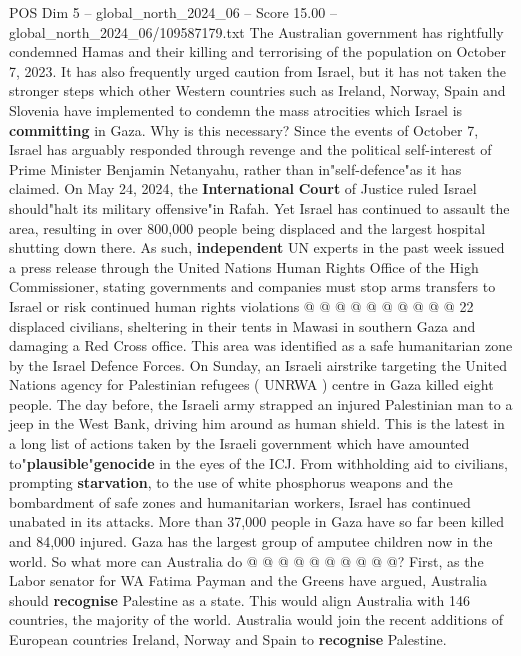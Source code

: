 \begin{textsample}{POS Dim 5 – global\_north\_2024\_06 – Score 15.00 – global\_north\_2024\_06/109587179.txt}  \label{ex:f5_pos_317}
The Australian government has rightfully condemned Hamas and their killing and terrorising of the population on October 7, 2023.
It has also frequently urged caution from Israel, but it has not taken the stronger steps which other Western countries such as Ireland, Norway, Spain and Slovenia have implemented to condemn the mass atrocities which Israel is \textbf{committing} in Gaza.
Why is this necessary?
Since the events of October 7, Israel has arguably responded through revenge and the political self-interest of Prime Minister Benjamin Netanyahu, rather than in"self-defence"as it has claimed.
On May 24, 2024, the \textbf{International} \textbf{Court} of Justice ruled Israel should"halt its military offensive"in Rafah.
Yet Israel has continued to assault the area, resulting in over 800,000 people being displaced and the largest hospital shutting down there.
As such, \textbf{independent} UN experts in the past week issued a press release through the United Nations Human Rights Office of the High Commissioner, stating governments and companies must stop arms transfers to Israel or risk continued human rights violations @ @ @ @ @ @ @ @ @ @ 22 displaced civilians, sheltering in their tents in Mawasi in southern Gaza and damaging a Red Cross office.
This area was identified as a safe humanitarian zone by the Israel Defence Forces.
On Sunday, an Israeli airstrike targeting the United Nations agency for Palestinian refugees ( UNRWA ) centre in Gaza killed eight people.
The day before, the Israeli army strapped an injured Palestinian man to a jeep in the West Bank, driving him around as human shield.
This is the latest in a long list of actions taken by the Israeli government which have amounted to"\textbf{plausible}"\textbf{genocide} in the eyes of the ICJ.
From withholding aid to civilians, prompting \textbf{starvation}, to the use of white phosphorus weapons and the bombardment of safe zones and humanitarian workers, Israel has continued unabated in its attacks.
More than 37,000 people in Gaza have so far been killed and 84,000 injured.
Gaza has the largest group of amputee children now in the world.
So what more can Australia do @ @ @ @ @ @ @ @ @ @?
First, as the Labor senator for WA Fatima Payman and the Greens have argued, Australia should \textbf{recognise} Palestine as a state.
This would align Australia with 146 countries, the majority of the world.
Australia would join the recent additions of European countries Ireland, Norway and Spain to \textbf{recognise} Palestine.

\end{textsample}
